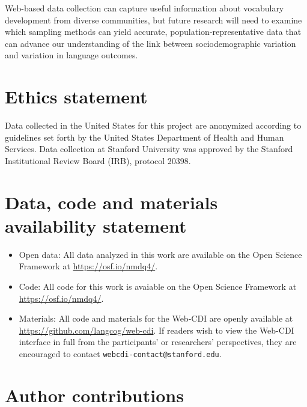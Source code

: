 \documentclass[
  english,
  ,man,floatsintext]{apa6}
\providecommand{\tightlist}{%
  \setlength{\itemsep}{0pt}\setlength{\parskip}{0pt}}
\begin{document}
Web-based data collection can capture useful information about vocabulary development from diverse communities, but future research will need to examine which sampling methods can yield accurate, population-representative data that can advance our understanding of the link between sociodemographic variation and variation in language outcomes.

\hypertarget{ethics-statement}{%
\section{Ethics statement}\label{ethics-statement}}

Data collected in the United States for this project are anonymized according to guidelines set forth by the United States Department of Health and Human Services. Data collection at Stanford University was approved by the Stanford Institutional Review Board (IRB), protocol 20398.

\hypertarget{data-code-and-materials-availability-statement}{%
\section{Data, code and materials availability statement}\label{data-code-and-materials-availability-statement}}

\begin{itemize}
\tightlist
\item
  Open data: All data analyzed in this work are available on the Open Science Framework at \url{https://osf.io/nmdq4/}.
\item
  Code: All code for this work is avaiable on the Open Science Framework at \url{https://osf.io/nmdq4/}.
\item
  Materials: All code and materials for the Web-CDI are openly available at \url{https://github.com/langcog/web-cdi}. If readers wish to view the Web-CDI interface in full from the participants' or researchers' perspectives, they are encouraged to contact \texttt{webcdi-contact@stanford.edu}.
\end{itemize}

\hypertarget{author-contributions}{%
\section{Author contributions}\label{author-contributions}}
\end{document}
